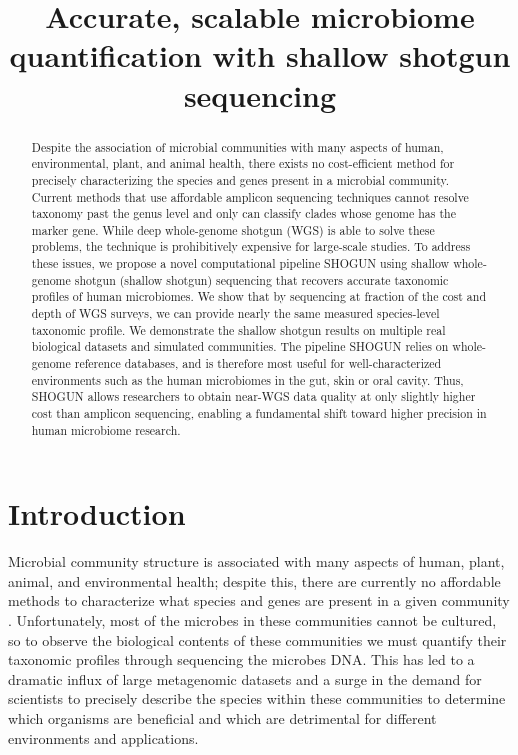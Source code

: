 \documentclass[conference,11pt]{IEEEtran}
\title{Accurate, scalable microbiome quantification with shallow shotgun sequencing}
\author{
    \IEEEauthorblockN{Benjamin Hillmann}
    \IEEEauthorblockA{
        \today
    }
}
\begin{document}
\onecolumn
\maketitle

\begin{abstract}

Despite the association of microbial communities with many aspects of human, environmental, plant, and animal health, there exists no cost-efficient method for precisely characterizing the species and genes present in a microbial community. Current methods that use affordable amplicon sequencing techniques cannot resolve taxonomy past the genus level and only can classify clades whose genome has the marker gene. While deep whole-genome shotgun (WGS) is able to solve these problems, the technique is prohibitively expensive for large-scale studies. To address these issues, we propose a novel computational pipeline SHOGUN using shallow whole-genome shotgun (shallow shotgun) sequencing that recovers accurate taxonomic profiles of human microbiomes. We show that by sequencing at fraction of the cost and depth of WGS surveys, we can provide nearly the same measured species-level taxonomic profile. We demonstrate the shallow shotgun results on multiple real biological datasets and simulated communities. The pipeline SHOGUN relies on whole-genome reference databases, and is therefore most useful for well-characterized environments such as the human microbiomes in the gut, skin or oral cavity. Thus, SHOGUN allows researchers to obtain near-WGS data quality at only slightly higher cost than amplicon sequencing, enabling a fundamental shift toward higher precision in human microbiome research.

\end{abstract}

\section{Introduction}

Microbial community structure is associated with many aspects of human, plant, animal, and environmental health; despite this, there are currently no affordable methods to characterize what species and genes are present in a given community \cite{prifti_new_2013}. Unfortunately, most of the microbes in these communities cannot be cultured, so to observe the biological contents of these communities we must quantify their taxonomic profiles through sequencing the microbes DNA. This has led to a dramatic influx of large metagenomic datasets and a surge in the demand for scientists to precisely describe the species within these communities to determine which organisms are beneficial and which are detrimental for different environments and applications.
\end{document}
